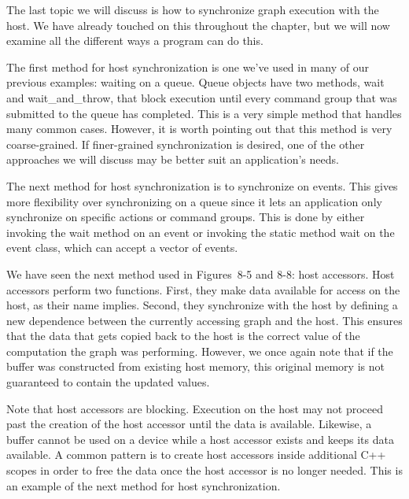 The last topic we will discuss is how to synchronize graph execution with the host. We have already touched on this throughout the chapter, but we will now examine all the different ways a program can do this.\par

The first method for host synchronization is one we’ve used in many of our previous examples: waiting on a queue. Queue objects have two methods, wait and wait\_and\_throw, that block execution until every command group that was submitted to the queue has completed. This is a very simple method that handles many common cases. However, it is worth pointing out that this method is very coarse-grained. If finer-grained synchronization is desired, one of the other approaches we will discuss may be better suit an application’s needs.\par

The next method for host synchronization is to synchronize on events. 
This gives more flexibility over synchronizing on a queue since it lets an 
application only synchronize on specific actions or command groups. This 
is done by either invoking the wait method on an event or invoking the 
static method wait on the event class, which can accept a vector of events.\par

We have seen the next method used in Figures 8-5 and 8-8: host accessors. Host accessors perform two functions. First, they make data available for access on the host, as their name implies. Second, they synchronize with the host by defining a new dependence between the currently accessing graph and the host. This ensures that the data that gets copied back to the host is the correct value of the computation the graph was performing. However, we once again note that if the buffer was constructed from existing host memory, this original memory is not guaranteed to contain the updated values.\par

Note that host accessors are blocking. Execution on the host may not proceed past the creation of the host accessor until the data is available. Likewise, a buffer cannot be used on a device while a host accessor exists and keeps its data available. A common pattern is to create host accessors inside additional C++ scopes in order to free the data once the host accessor is no longer needed. This is an example of the next method for host synchronization.\par

